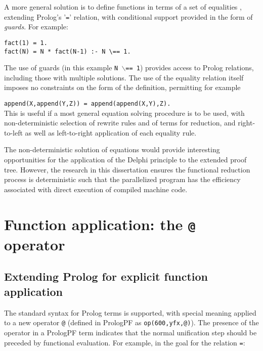 A more general solution is to define functions in terms of a set of
equalities \cite{Han94, Nai91},
extending Prolog's '\texttt{=}' relation, with conditional
support provided in the form of \textit{guards}.  For example:

\begin{verbatim}
fact(1) = 1.
fact(N) = N * fact(N-1) :- N \== 1.
\end{verbatim}

The use of guards (in this example \texttt{N $\backslash$== 1})
provides access to Prolog relations, including those
with multiple solutions.  The use of the equality relation itself imposes
no constraints on the form of the definition, permitting for example

\texttt{append(X,append(Y,Z)) = append(append(X,Y),Z).}\\

This is useful if a most general equation solving procedure is to
be used, with non-deterministic selection of rewrite rules and
of terms for reduction, and right-to-left as well as left-to-right
application of each equality rule.

The non-deterministic solution of equations would provide interesting
opportunities for the application of the Delphi principle to the
extended proof tree.  However, the research in this dissertation
ensures the functional reduction process is deterministic such that
the parallelized program has the efficiency associated with
direct execution
of compiled machine code.

\section{Function application: the \texttt{@} operator} %

\subsection{Extending Prolog for explicit function application}

The standard syntax for Prolog terms is supported, with special meaning 
applied to a new operator \texttt{@} (defined in PrologPF as
\texttt{op(600,yfx,@)}).  The presence of the operator in a PrologPF
term indicates that the normal unification step should be preceded by
functional evaluation.  For example, in the goal for the relation \texttt{=}:

